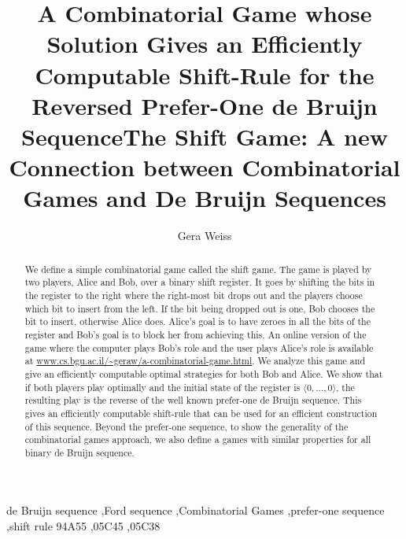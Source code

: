 \documentclass[final,12pt]{elsarticle}
\title{A Combinatorial Game whose Solution Gives an Efficiently Computable Shift-Rule for the Reversed Prefer-One de Bruijn Sequence}
\theoremstyle{definition} \newtheorem{definition}[theorem]{Definition} \newtheorem{observation}[theorem]{Observation} \newtheorem{example}[theorem]{Example} \newtheorem{remark}[theorem]{Remark} \newtheorem{corrolary}[theorem]{Corrolary}
\newcommand{\T}[1]{\langle{#1}\rangle} \DeclareMathOperator{\drop}{drop} \DeclareMathOperator{\dropbits}{drop\_bits} \DeclareMathOperator{\dropstates}{drop\_states} \DeclareMathOperator{\leadingForm}{LeadingForm} \DeclareMathOperator{\dv}{div} %
\begin{document}


\sloppy
{}
\begin{frontmatter}
	
	\title{The Shift Game: A new Connection between Combinatorial Games and De Bruijn Sequences} 
	
	
	\author{Gera Weiss}
	
	\address{Department of Computer Science, Ben-Gurion University of The Negev} 
	
	\begin{abstract}
		We define a simple combinatorial game called the shift game. The game is played by two players, Alice and Bob, over a binary shift register. It goes by shifting the bits in the register to the right where the right-most bit drops out and the players choose which bit to insert from the left. If the bit being dropped out is one, Bob chooses the bit to insert, otherwise Alice does. Alice's goal is to have zeroes in all the bits of the register and Bob's goal is to block her from achieving this. An online version of the game where the computer plays Bob's role and the user plays Alice's role is available at \url{www.cs.bgu.ac.il/~geraw/a-combinatorial-game.html}. We analyze this game and give an efficiently computable optimal strategies for both Bob and Alice. We show that if both players play optimally and the initial state of the register is $\T{0,\dots,0}$, the resulting play is the reverse of the well known prefer-one de Bruijn sequence. This gives an efficiently computable shift-rule that can be used for an efficient construction of this sequence. Beyond the prefer-one sequence, to show the generality of the combinatorial games approach, we also define a games with similar properties for all binary de Bruijn sequence.
	\end{abstract}

	\begin{keyword}
		de Bruijn sequence \sep Ford sequence \sep Combinatorial Games \sep prefer-one sequence \sep shift rule
		\MSC[2010] 94A55 \sep 05C45 \sep 05C38
	\end{keyword}
	
\end{frontmatter}
\end{document}
